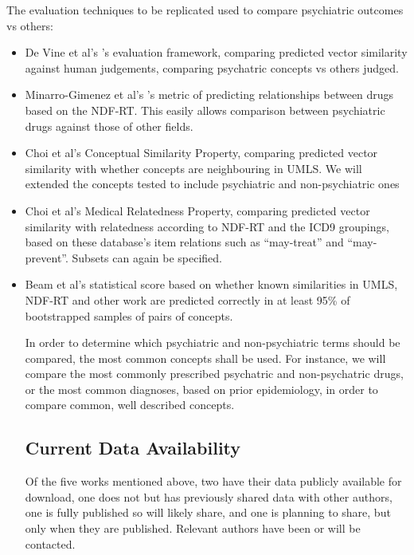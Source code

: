 \documentclass[10pt]{article}
\begin{document}
The evaluation techniques to be replicated used to compare psychiatric outcomes vs others:
\begin{itemize}
	\item De Vine et al's 's evaluation framework, comparing predicted vector similarity against human judgements, comparing psychatric concepts vs others judged.  
	\item Minarro-Gimenez et al's 's metric of predicting relationships between drugs based on the NDF-RT. This easily allows comparison between psychiatric drugs against those of other fields.
	\item Choi et al's  Conceptual Similarity Property, comparing predicted vector similarity with whether concepts are neighbouring in UMLS. We will extended the concepts tested to include psychiatric and non-psychiatric ones
	\item Choi et al's  Medical Relatedness Property, comparing predicted vector similarity with relatedness according to NDF-RT and the ICD9 groupings, based on these database's item relations such as ``may-treat'' and ``may-prevent''. Subsets can again be specified.
	\item Beam et al's  statistical score based on whether known similarities in UMLS, NDF-RT and other work are predicted correctly in at least 95\% of bootstrapped samples of pairs of concepts. 

In order to determine which psychiatric and non-psychiatric terms should be compared, the most common concepts shall be used. For instance, we will compare the most commonly prescribed psychatric and non-psychatric drugs, or the most common diagnoses, based on prior epidemiology, in order to compare common, well described concepts.

\subsection{Current Data Availability}

Of the five works mentioned above, two have their data publicly available for download, one does not but has previously shared data with other authors, one is fully published so will likely share, and one is planning to share, but only when they are published. Relevant authors have been or will be contacted. 


\end{itemize}
\end{document}
